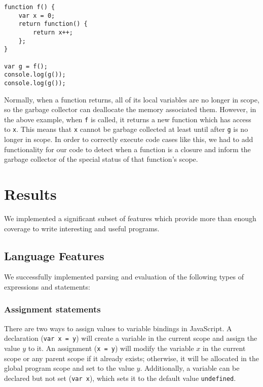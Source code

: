 \documentclass{article}
\begin{document}
\begin{multicols}{2}
\vspace{3mm}

\begin{lstlisting}
function f() {
    var x = 0;
    return function() {
        return x++;
    };
}

var g = f();
console.log(g());
console.log(g());

\end{lstlisting}

\vspace{3mm}

Normally, when a function returns, all of its local variables are no longer in
scope, so the garbage collector can deallocate the memory associated them.
However, in the above example, when \texttt{f} is called, it returns a new
function which has access to \texttt{x}. This means that \texttt{x} cannot
be garbage collected at least until after \texttt{g} is no longer in scope.
In order to correctly execute code cases like this, we had to add functionality
for our code to detect when a function is a closure and inform the garbage
collector of the special status of that function's scope.

\section{Results}

We implemented a significant subset of features which provide more than enough
coverage to write interesting and useful programs.

\subsection{Language Features}

We successfully implemented parsing and evaluation of the following types of
expressions and statements:

\subsubsection*{Assignment statements}

There are two ways to assign values to variable bindings in JavaScript. A
declaration (\texttt{var x = y}) will create a variable in the current scope and
assign the value $y$ to it. An assignment (\texttt{x = y}) will modify the
variable $x$ in the current scope or any parent scope if it already exists;
otherwise, it will be allocated in the global program scope and set to the value
$y$. Additionally, a variable can be declared but not set (\texttt{var x}),
which sets it to the default value \texttt{undefined}.


\end{multicols}
\end{document}
